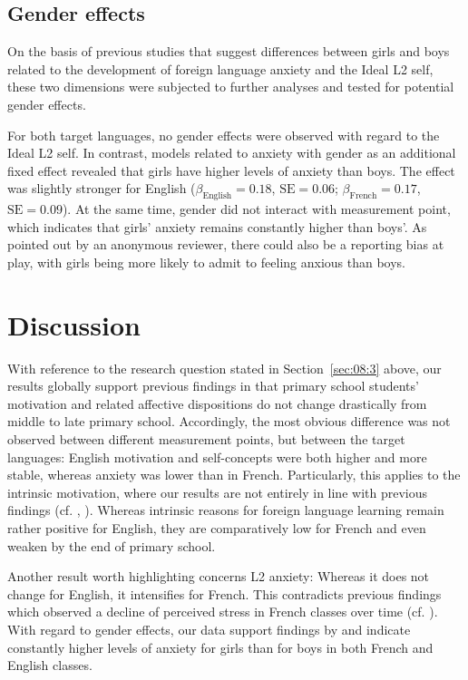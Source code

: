 \documentclass[output=paper]{langsci/langscibook}
\begin{document}
\subsection{Gender effects}

On the basis of previous studies that suggest differences between girls and boys related to the development of foreign language anxiety and the Ideal L2 self, these two dimensions were subjected to further analyses and tested for potential gender effects. 

For both target languages, no gender effects were observed with regard to the Ideal L2 self. In contrast, models related to anxiety with gender as an additional fixed effect revealed that girls have higher levels of anxiety than boys. The effect was slightly stronger for English ($\beta_{\text{English}}=0.18$, $\text{SE}=0.06$; \newline
 $\beta_{\text{French}}=0.17$, $\text{SE}=0.09$). At the same time, gender did not interact with measurement point, which indicates that girls’ anxiety remains constantly higher than boys’. As pointed out by an anonymous reviewer, there could also be a reporting bias at play, with girls being more likely to admit to feeling anxious than boys.

\section{Discussion}

With reference to the research question stated in Section~\ref{sec:08:3} above, our results globally support previous findings in that primary school students’ motivation and related affective dispositions do not change drastically from middle to late primary school. Accordingly, the most obvious difference was not observed between different measurement points, but between the target languages: English motivation and self-concepts were both higher and more stable, whereas anxiety was lower than in French. Particularly, this applies to the intrinsic motivation, where our results are not entirely in line with previous findings (cf. \citealt{Heinzmann2013}, \citealt{BruehwilerLePapeRacine2017}). Whereas intrinsic reasons for foreign language learning remain rather positive for English, they are comparatively low for French and even weaken by the end of primary school.

Another result worth highlighting concerns L2 anxiety: Whereas it does not change for English, it intensifies for French. This contradicts previous findings which observed a decline of perceived stress in French classes over time (cf. \citealt{SinghElmiger2017}). With regard to gender effects, our data support findings by \citet{DewaeleEtAl2016} and indicate constantly higher levels of anxiety for girls than for boys in both French and English classes.
\end{document}
